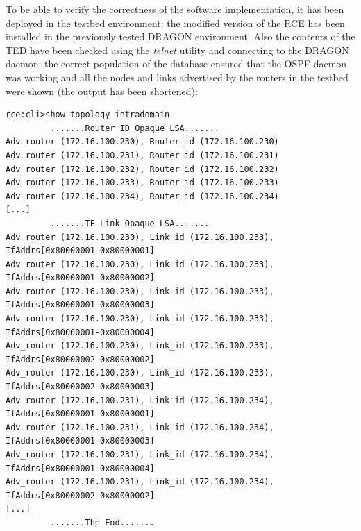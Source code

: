\documentclass[10pt,a4paper]{report}
\begin{document}
To be able to verify the correctness of the software implementation,
it has been deployed in the testbed environment: the modified version
of the RCE has been installed in the previously tested DRAGON
environment. Also the contents of the TED have been checked using the
\textit{telnet} utility and connecting to the DRAGON daemon: the
correct population of the database ensured that the OSPF daemon was
working and all the nodes and links advertised by the routers in the
testbed were shown (the output has been shortened):

{\small
\begin{verbatim}
rce:cli>show topology intradomain 
         .......Router ID Opaque LSA.......
Adv_router (172.16.100.230), Router_id (172.16.100.230)
Adv_router (172.16.100.231), Router_id (172.16.100.231)
Adv_router (172.16.100.232), Router_id (172.16.100.232)
Adv_router (172.16.100.233), Router_id (172.16.100.233)
Adv_router (172.16.100.234), Router_id (172.16.100.234)
[...]
         .......TE Link Opaque LSA....... 
Adv_router (172.16.100.230), Link_id (172.16.100.233), IfAddrs[0x80000001-0x80000001] 
Adv_router (172.16.100.230), Link_id (172.16.100.233), IfAddrs[0x80000001-0x80000002] 
Adv_router (172.16.100.230), Link_id (172.16.100.233), IfAddrs[0x80000001-0x80000003] 
Adv_router (172.16.100.230), Link_id (172.16.100.233), IfAddrs[0x80000001-0x80000004] 
Adv_router (172.16.100.230), Link_id (172.16.100.233), IfAddrs[0x80000002-0x80000002] 
Adv_router (172.16.100.230), Link_id (172.16.100.233), IfAddrs[0x80000002-0x80000003] 
Adv_router (172.16.100.231), Link_id (172.16.100.234), IfAddrs[0x80000001-0x80000001] 
Adv_router (172.16.100.231), Link_id (172.16.100.234), IfAddrs[0x80000001-0x80000003] 
Adv_router (172.16.100.231), Link_id (172.16.100.234), IfAddrs[0x80000001-0x80000004] 
Adv_router (172.16.100.231), Link_id (172.16.100.234), IfAddrs[0x80000002-0x80000002] 
[...]
         .......The End.......
\end{verbatim}
}
\end{document}
